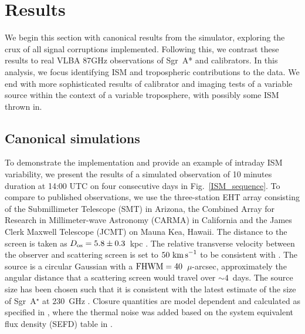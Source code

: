 \chapter{Results}
We begin this section with canonical results from the simulator, exploring the crux of all signal corruptions implemented. Following this, we contrast these results to real VLBA 87GHz observations of Sgr~A* and calibrators. In this analysis, we focus identifying ISM and tropospheric contributions to the data. We end with more sophisticated results of calibrator and imaging tests of a variable source within the context of a variable troposphere, with possibly some ISM thrown in.



\section{Canonical simulations}\label{sec:can_sim}

%

To demonstrate the implementation and provide an example of intraday ISM variability, we present the results of a simulated observation of 10 minutes duration at 14:00 UTC on four consecutive days in Fig.~\ref{ISM_sequence}. To compare to published observations, we use the three-station EHT array consisting of the Submillimeter Telescope (SMT) in Arizona, the Combined Array for Research in Millimeter-wave Astronomy (CARMA) in California and the James Clerk Maxwell Telescope (JCMT) on Mauna Kea, Hawaii. The distance to the screen is taken as $D_{\rm os}=5.8 \pm 0.3$~kpc  \citep{Bower_2014}. The relative transverse velocity between the observer and scattering screen is set to $50~\rm{km\,s}^{-1}$ to be consistent with \citet{2016arXiv160106571O}. The source is a circular Gaussian with a $\rm{FHWM}=40$~$\mu$-arcsec, approximately the angular distance that a scattering screen would travel over $\sim 4$~days. The source size has been chosen such that it is consistent with the latest estimate of the size of Sgr~A$^\star$ at $230$~GHz \citep{Fish_2011}.  Closure quantities are model dependent and calculated as specified in \citet{Rogers_1995}, where the thermal noise was added based on the system equivalent flux density (SEFD) table in \citep{Lu_2014}. 

